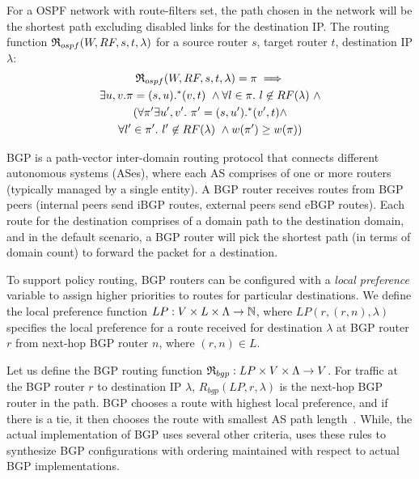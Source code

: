 \noindent 
For a OSPF network with route-filters set, the
path chosen in the network will be the shortest path
excluding disabled links for the destination IP. The routing
function $\mathfrak{R}_{ospf}(W,RF,s,t,\lambda)$ for a
source router $s$, target router $t$, destination IP 
$\lambda$: 
\begin{multline}
\mathfrak{R}_{ospf}(W,RF,s,t,\lambda) = \pi \implies 
\\ \exists u,v. \pi=(s,u).^*(v,t) ~\wedge 
\forall l \in \pi.~l \not\in RF(\lambda) ~\wedge  \\
(\forall \pi' \exists u',v'. ~\pi'=(s,u').^*(v',t) \wedge \\
\forall l' \in \pi'.~l' \not\in RF(\lambda) ~\wedge
w(\pi') \geq w(\pi))
\end{multline}


BGP is a path-vector inter-domain 
routing protocol that connects 
different autonomous systems (ASes), where each AS
comprises of one or more routers (typically managed
by a single entity). A BGP router receives routes 
from BGP peers (internal peers send iBGP routes, 
external peers send eBGP routes). Each route 
for the destination comprises of a domain path
 to the destination domain, and in the default
 scenario, a BGP router will pick the shortest
 path (in terms of domain count) to forward
 the packet for a destination. 
 
To support policy routing, BGP routers can be 
configured with a \emph{local preference} variable
to assign higher priorities to routes for particular
destinations. We define the local preference function 
$LP: V \times L \times \Lambda \rightarrow \mathbb{N}$, where
$LP(r, (r,n), \lambda)$ 
specifies the local preference for a route received 
for destination $\lambda$ at BGP router $r$ 
from next-hop BGP router $n$, where $(r,n) \in L$.

Let us define the BGP routing function 
$\mathfrak{R}_{bgp}: LP \times V \times \Lambda \rightarrow V$.
For traffic at the BGP router $r$ to
destination IP $\lambda$, $R_{bgp}(LP,r,\lambda)$ 
is the next-hop BGP router in the path. BGP 
chooses a route with highest local preference, and
if there is a tie, it then chooses the route with smallest
AS path length~\cite{bgp}. While, the actual implementation
of BGP uses several other criteria,
\name uses these rules to synthesize BGP configurations with 
ordering maintained with respect to actual BGP implementations.


